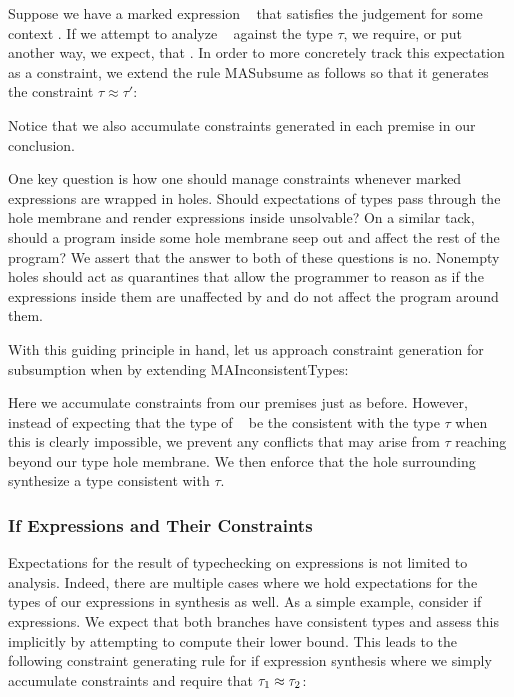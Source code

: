 Suppose we have a marked expression \ECMV~ that satisfies the judgement  for some context \ctx. If we attempt to analyze \ECMV~ against the type $\tau$, we require, or put another way, we expect, that . In order to more concretely track this expectation as a constraint, we extend the rule MASubsume as follows so that it generates the constraint $\tau \approx \tau'$:
\begin{mathpar}
\end{mathpar}
Notice that we also accumulate constraints generated in each premise in our conclusion.

One key question is how one should manage constraints whenever marked expressions are wrapped in holes. Should expectations of types pass through the hole membrane and render expressions inside unsolvable? On a similar tack, should a program inside some hole membrane seep out and affect the rest of the program? We assert that the answer to both of these questions is no. Nonempty holes should act as quarantines that allow the programmer to reason as if the expressions inside them are unaffected by and do not affect the program around them.

With this guiding principle in hand, let us approach constraint generation for subsumption when  by extending MAInconsistentTypes:
\begin{mathpar}
\end{mathpar}
Here we accumulate constraints from our premises just as before. However, instead of expecting that the type of \ECMV~ be the consistent with the type $\tau$ when this is clearly impossible, we prevent any conflicts that may arise from $\tau$ reaching beyond our type hole membrane. We then enforce that the hole surrounding \ECMV~ synthesize a type consistent with $\tau$.

\subsubsection{If Expressions and Their Constraints}
Expectations for the result of typechecking on expressions is not limited to analysis. Indeed, there are multiple cases where we hold expectations for the types of our expressions in synthesis as well. As a simple example, consider if expressions. We expect that both branches have consistent types and assess this implicitly by attempting to compute their lower bound. This leads to the following constraint generating rule for if expression synthesis where we simply accumulate constraints and require that $\TMV_1 \approx \TMV_2$:

